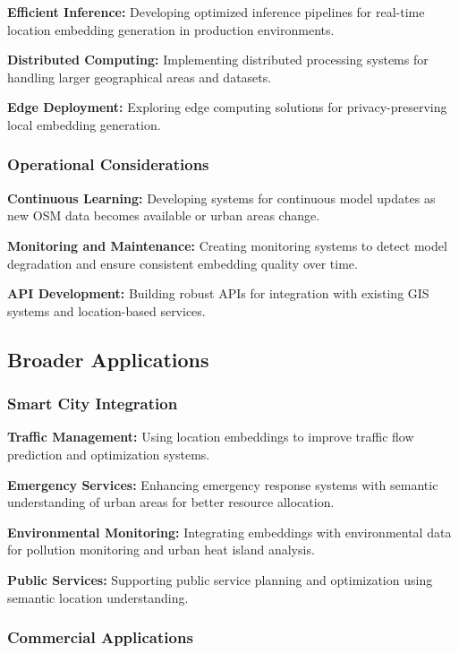 \textbf{Efficient Inference:} Developing optimized inference pipelines for real-time location embedding generation in production environments.

\textbf{Distributed Computing:} Implementing distributed processing systems for handling larger geographical areas and datasets.

\textbf{Edge Deployment:} Exploring edge computing solutions for privacy-preserving local embedding generation.

\subsubsection{Operational Considerations}

\textbf{Continuous Learning:} Developing systems for continuous model updates as new OSM data becomes available or urban areas change.

\textbf{Monitoring and Maintenance:} Creating monitoring systems to detect model degradation and ensure consistent embedding quality over time.

\textbf{API Development:} Building robust APIs for integration with existing GIS systems and location-based services.

\subsection{Broader Applications}

\subsubsection{Smart City Integration}

\textbf{Traffic Management:} Using location embeddings to improve traffic flow prediction and optimization systems.

\textbf{Emergency Services:} Enhancing emergency response systems with semantic understanding of urban areas for better resource allocation.

\textbf{Environmental Monitoring:} Integrating embeddings with environmental data for pollution monitoring and urban heat island analysis.

\textbf{Public Services:} Supporting public service planning and optimization using semantic location understanding.

\subsubsection{Commercial Applications}

